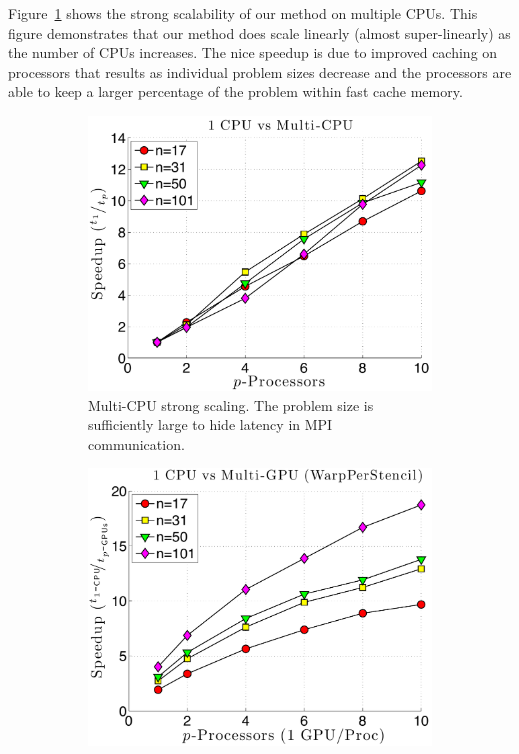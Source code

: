Figure~\ref{fig:alltoall_multicpu_scaling} shows the strong scalability of our method on multiple CPUs. This figure demonstrates that our method does scale linearly (almost super-linearly) as the number of CPUs increases. 
The nice speedup is due to improved caching on processors that results as individual problem sizes decrease and the processors are able to keep a larger percentage of the problem within fast cache memory. 

\begin{figure}
\centering
\begin{subfigure}[t]{0.425\textwidth}
\centering
\includegraphics[width=1.0\textwidth]{../figures/keeneland_results/alltoallv_cosine/speedup_1CPU_vs_NCPU.pdf}
\caption{Multi-CPU strong scaling. The problem size is sufficiently large to hide latency in MPI communication.}
\label{fig:alltoall_multicpu_scaling}
\end{subfigure} 
\begin{subfigure}[t]{0.425\textwidth}
\centering
\includegraphics[width=1.0\textwidth]{../figures/keeneland_results/alltoallv_cosine/speedup_1CPU_vs_NGPU_WarpPerStencil.pdf}

\end{subfigure}
\end{figure}
